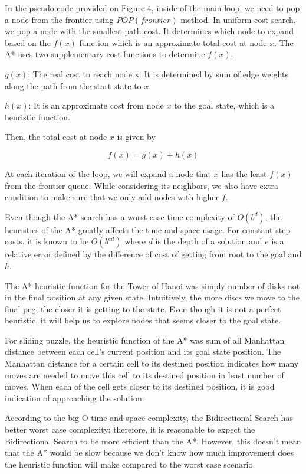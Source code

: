\documentclass[conference]{IEEEtran}
\begin{document}
In the pseudo-code provided on Figure 4, inside of the main loop, we need to pop a node from the frontier using $POP(frontier)$ method. In uniform-cost search, we pop a node with the smallest path-cost. It determines which node to expand based on the $f(x)$ function which is an approximate total cost at node $x$. The A* uses two supplementary cost functions to determine $f(x)$.

$g(x)$: The real cost to reach node x. It is determined by sum of edge weights along the path from the start state to $x$.

$h(x)$: It is an approximate cost from node $x$ to the goal state, which is a heuristic function.

Then, the total cost at node $x$ is given by

\begin{equation}
    f(x) = g(x) + h(x)
\end{equation}

At each iteration of the loop, we will expand a node that $x$ has the least $f(x)$ from the frontier queue. While considering its neighbors, we also have extra condition to make sure that we only add nodes with higher $f$.

Even though the A* search has a worst case time complexity of $O(b^d)$, the heuristics of the A* greatly affects the time and space usage. For constant step costs, it is known to be $O(b^{ed})$ where $d$ is the depth of a solution and $e$ is a relative error defined by the difference of cost of getting from root to the goal and $h$.

The A* heuristic function for the Tower of Hanoi was simply number of disks not in the final position at any given state. Intuitively, the more discs we move to the final peg, the closer it is getting to the state. Even though it is not a perfect heuristic, it will help us to explore nodes that seems closer to the goal state.

For sliding puzzle, the heuristic function of the A* was sum of all Manhattan distance between each cell's current position and its goal state position. The Manhattan distance for a certain cell to its destined position indicates how many moves are needed to move this cell to its destined position in least number of moves. When each of the cell gets closer to its destined position, it is good indication of approaching the solution. 

According to the big O time and space complexity, the Bidirectional Search has better worst case complexity; therefore, it is reasonable to expect the Bidirectional Search to be more efficient than the A*. However, this doesn't mean that the A* would be slow because we don't know how much improvement does the heuristic function will make compared to the worst case scenario. 
\end{document}
